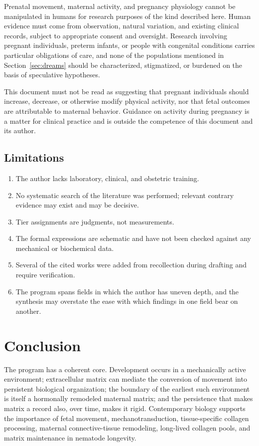 \documentclass[11pt,a4paper]{article}
\theoremstyle{plain}
\theoremstyle{definition}
\theoremstyle{remark}
\begin{document}
Prenatal movement, maternal activity, and pregnancy physiology cannot be manipulated in humans for research purposes of the kind described here. Human evidence must come from observation, natural variation, and existing clinical records, subject to appropriate consent and oversight. Research involving pregnant individuals, preterm infants, or people with congenital conditions carries particular obligations of care, and none of the populations mentioned in Section~\ref{sec:dreams} should be characterized, stigmatized, or burdened on the basis of speculative hypotheses.

This document must not be read as suggesting that pregnant individuals should increase, decrease, or otherwise modify physical activity, nor that fetal outcomes are attributable to maternal behavior. Guidance on activity during pregnancy is a matter for clinical practice and is outside the competence of this document and its author.

\subsection{Limitations}

\begin{enumerate}[itemsep=2pt]
\item The author lacks laboratory, clinical, and obstetric training.
\item No systematic search of the literature was performed; relevant contrary evidence may exist and may be decisive.
\item Tier assignments are judgments, not measurements.
\item The formal expressions are schematic and have not been checked against any mechanical or biochemical data.
\item Several of the cited works were added from recollection during drafting and require verification.
\item The program spans fields in which the author has uneven depth, and the synthesis may overstate the ease with which findings in one field bear on another.
\end{enumerate}

\section{Conclusion}

The program has a coherent core. Development occurs in a mechanically active environment; extracellular matrix can mediate the conversion of movement into persistent biological organization; the boundary of the earliest such environment is itself a hormonally remodeled maternal matrix; and the persistence that makes matrix a record also, over time, makes it rigid. Contemporary biology supports the importance of fetal movement, mechanotransduction, tissue-specific collagen processing, maternal connective-tissue remodeling, long-lived collagen pools, and matrix maintenance in nematode longevity.
\end{document}
